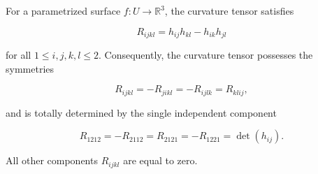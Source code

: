 For a parametrized surface $f: U \to \mathbb{R}^3$, the curvature tensor satisfies

$$
R_{ijkl} = h_{ij} h_{kl} - h_{ik} h_{jl}
$$

for all $1 \leq i, j, k, l \leq 2$. Consequently, the curvature tensor possesses the symmetries

$$
R_{ijkl} = -R_{jikl} = -R_{ijlk} = R_{klij},
$$

and is totally determined by the single independent component

$$
R_{1212} = -R_{2112} = R_{2121} = -R_{1221} = \det(h_{ij}).
$$

All other components $R_{ijkl}$ are equal to zero.
